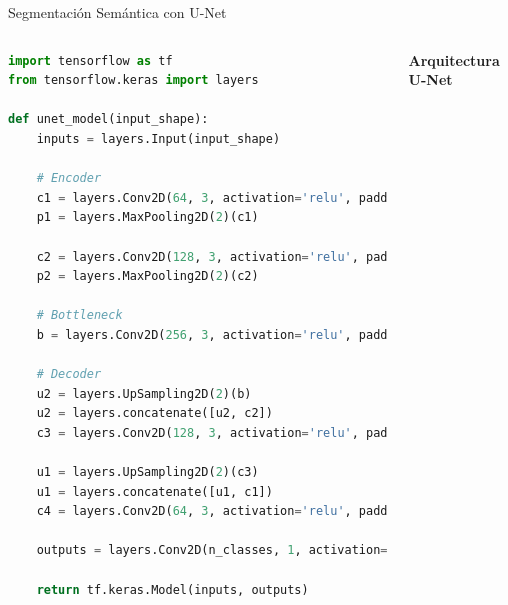 \documentclass[10pt,aspectratio=169]{beamer}
\begin{document}
\begin{frame}[fragile]{Segmentación Semántica con U-Net}
    \begin{columns}
        \begin{lstlisting}[language=Python,basicstyle=\tiny]
import tensorflow as tf
from tensorflow.keras import layers

def unet_model(input_shape):
    inputs = layers.Input(input_shape)

    # Encoder
    c1 = layers.Conv2D(64, 3, activation='relu', padding='same')(inputs)
    p1 = layers.MaxPooling2D(2)(c1)

    c2 = layers.Conv2D(128, 3, activation='relu', padding='same')(p1)
    p2 = layers.MaxPooling2D(2)(c2)

    # Bottleneck
    b = layers.Conv2D(256, 3, activation='relu', padding='same')(p2)

    # Decoder
    u2 = layers.UpSampling2D(2)(b)
    u2 = layers.concatenate([u2, c2])
    c3 = layers.Conv2D(128, 3, activation='relu', padding='same')(u2)

    u1 = layers.UpSampling2D(2)(c3)
    u1 = layers.concatenate([u1, c1])
    c4 = layers.Conv2D(64, 3, activation='relu', padding='same')(u1)

    outputs = layers.Conv2D(n_classes, 1, activation='softmax')(c4)

    return tf.keras.Model(inputs, outputs)
        \end{lstlisting}

        \begin{center}
            \textbf{Arquitectura U-Net}
        \end{center}
\end{columns}
\end{frame}
\end{document}
